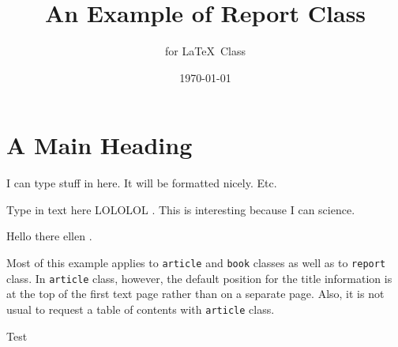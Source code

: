 \documentclass[11pt]{report}            %
\title{\bf An Example of Report Class}  %
\author{for \LaTeX\ Class}              %
\date{\today}                           %
\begin{document}
\maketitle
\setcounter{page}{2}
\tableofcontents


\chapter{A Main Heading}

I can type stuff in here. It will be formatted nicely.
Etc.

Type in text here LOLOLOL \cite{cahill}. This is interesting because I can science.

Hello there ellen \cite{RN51}.

Most of this example applies to \texttt{article} and \texttt{book} classes
as well as to \texttt{report} class. In \texttt{article} class, however,
the default position for the title information is at the top of
the first text page rather than on a separate page. Also, it is
not usual to request a table of contents with \texttt{article} class.

Test \cite{RN51}



\end{document}
